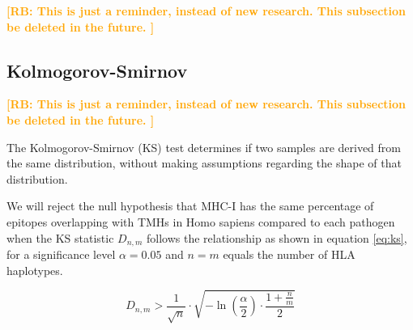 \documentclass{article}
\newcommand{\richel}[1]{\textcolor{orange}{\textbf{[RB: #1]}}}
\begin{document}
\richel{
  This is just a reminder, instead of new research. 
  This subsection be deleted in the future.
}

\begin{table}
  
  \caption{
    Percentage of MHC-II haplotypes, from \cite{greenbaum2011functional}
    \richel{
      This is just a reminder, instead of new research. 
      This table be deleted in the future.
    }
  }
  \label{table:mhc2_haplotypes}
\end{table}

\subsection{Kolmogorov-Smirnov}

\richel{
  This is just a reminder, instead of new research. 
  This subsection be deleted in the future.
}

The Kolmogorov-Smirnov (KS) test determines if two samples
are derived from the same distribution, without making assumptions
regarding the shape of that distribution. 

We will reject
the null hypothesis that MHC-I has the same percentage of epitopes 
overlapping with TMHs in Homo sapiens compared to each pathogen when 
the KS statistic $D_{n,m}$ follows the relationship as shown in 
equation \ref{eq:ks}, for a significance level $\alpha = 0.05$
and $n = m$ equals the number of HLA haplotypes.

\begin{equation}
   D_{n,m} > \frac{1}{\sqrt{n}} \cdot \sqrt{ -\ln(\frac{\alpha}{2}) \cdot \frac{1 + \frac{n}{m}}{2} }
   \label{eq:ks}
\end{equation}
\end{document}
